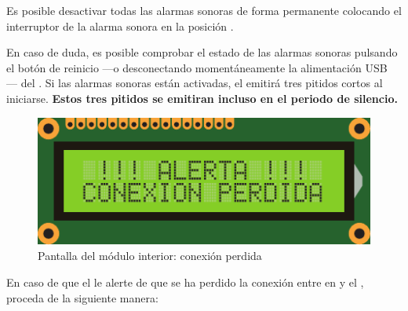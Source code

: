Es posible desactivar todas las alarmas sonoras de forma permanente colocando el interruptor de la alarma sonora  en la posición \off.
\tipend

En caso de duda, es posible comprobar el estado de las alarmas sonoras pulsando el botón de reinicio  ---o desconectando momentáneamente la alimentación USB --- del \MIE. Si las alarmas sonoras están activadas, el \CMS emitirá tres pitidos cortos al iniciarse. \textbf{Estos tres pitidos se emitiran incluso en el periodo de silencio.}
\tipend



\begin{figure}[H]
  \centering
  \includegraphics[width=0.6\columnwidth]{images/screen-conn-lost}
  \caption{Pantalla del módulo interior: conexión perdida}
  \label{fig:screen-conn-lost}
\end{figure}


En caso de que el \CMS le alerte de que se ha perdido la conexión entre en \MIE y el \MEE, proceda de la siguiente manera:

